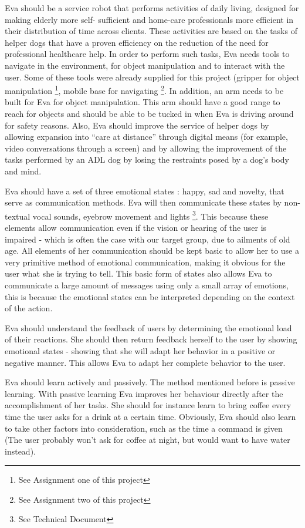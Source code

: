 \documentclass[project_eva.tex]{subfiles}
\begin{document}
Eva should be a service robot that performs activities of daily living, designed for making elderly more self-
sufficient\cite{Forlizzi} and home-care professionals more efficient in their distribution of time across clients. These 
activities are based on the tasks of helper dogs that have a proven efficiency on the reduction of the need for 
professional healthcare help\cite{Diepenhorst}. In order to perform such tasks, Eva needs tools to navigate in the 
environment, for object manipulation and to interact with the user. Some of these tools were already supplied for this 
project (gripper for object manipulation \footnote{See Assignment one of this project}, mobile base for navigating 
\footnote{See Assignment two of this project}. In addition, an arm needs to be built for Eva for object manipulation. This 
arm should have a good range to reach for objects and should be able to be tucked in when Eva is driving around for safety 
reasons. Also, Eva should improve the service of helper dogs by allowing expansion into ``care at distance'' \cite{Evers} 
through digital means (for example, video conversations through a screen) and by allowing the improvement of the tasks 
performed by an ADL dog by losing the restraints posed by a dog’s body and mind.

Eva should have a set of three emotional states \pageref{sec:Emotion expression}: happy, sad and novelty, that serve as 
communication methods. Eva will then communicate these states by non-textual vocal sounds, eyebrow movement and lights 
\footnote{See Technical Document}. This because these elements allow communication even if the vision or hearing of the 
user is impaired - which is often the case with our target group, due to ailments of old age. All elements of her 
communication should be kept basic to allow her to use a very primitive method of emotional communication, making it 
obvious for the user what she is trying to tell. This basic form of states also allows Eva to communicate a large amount of 
messages using only a small array of emotions, this is because the emotional states can be interpreted depending on the 
context of the action.

Eva should understand the feedback of users by determining the emotional load of their reactions. She should then return 
feedback herself to the user by showing emotional states - showing that she will adapt her behavior in a positive or 
negative manner. This allows Eva to adapt her complete behavior to the user.

Eva should learn actively and passively. The method mentioned before is passive learning. With passive learning Eva 
improves her behaviour directly after the accomplishment of her tasks. She should for instance learn to bring coffee every 
time the user asks for a drink at a certain time. Obviously, Eva should also learn to take other factors into consideration, such as the time a command is given (The user probably won't ask for coffee at night, but would want to have water instead).
\end{document}
